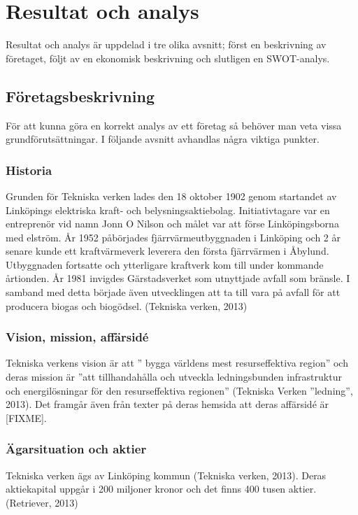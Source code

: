 \documentclass[10pt,a4paper]{article}
\begin{document}
\section{Resultat och analys}
Resultat och analys är uppdelad i tre olika avsnitt; först en beskrivning av
företaget, följt av en ekonomisk beskrivning och slutligen en SWOT-analys.

\subsection{Företagsbeskrivning}
För att kunna göra en korrekt analys av ett företag så behöver man veta vissa
grundförutsättningar. I följande avsnitt avhandlas några viktiga punkter. 

\subsubsection{Historia}
Grunden för Tekniska verken lades den 18 oktober 1902 genom startandet av
Linköpings elektriska kraft- och belysningsaktiebolag. Initiativtagare var en
entreprenör vid namn Jonn O Nilson och målet var att förse Linköpingsborna med
elström. År 1952 påbörjades fjärrvärmeutbyggnaden i Linköping och 2 år senare
kunde ett kraftvärmeverk leverera den första fjärrvärmen i Åbylund. Utbyggnaden
fortsatte och ytterligare kraftverk kom till under kommande årtionden. År 1981 
invigdes Gärstadsverket som utnyttjade avfall som bränsle. I samband med detta
började även utvecklingen att ta till vara på avfall för att producera biogas 
och biogödsel. (Tekniska verken, 2013) 

\subsubsection{Vision, mission, affärsidé}
Tekniska verkens vision är att '' bygga världens mest resurseffektiva
region'' och deras mission är ''att tillhandahålla och utveckla
ledningsbunden infrastruktur och energilösningar för den
resurseffektiva regionen'' (Tekniska Verken ''ledning'', 2013). Det framgår även
från texter på deras hemsida att deras affärsidé är [FIXME].

\subsubsection{Ägarsituation och aktier}
Tekniska verken ägs av Linköping kommun (Tekniska verken, 2013). Deras
aktiekapital uppgår i 200 miljoner kronor och det finns 400 tusen
aktier.(Retriever, 2013)
\end{document}

